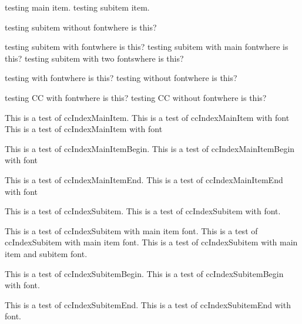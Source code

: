 \documentclass{article}
\begin{document}
{{{{testing main item.
testing subitem item.


testing subitem without fontwhere is this?

testing subitem with fontwhere is this?
testing subitem with main fontwhere is this?
testing subitem with two fontswhere is this?


testing with fontwhere is this?
testing without fontwhere is this?


testing CC with fontwhere is this?
testing CC without fontwhere is this?

This is a test of ccIndexMainItem.
This is a test of ccIndexMainItem with font
This is a test of ccIndexMainItem with font


This is a test of ccIndexMainItemBegin.
This is a test of ccIndexMainItemBegin with font

\pagebreak

This is a test of ccIndexMainItemEnd.
This is a test of ccIndexMainItemEnd with font


This is a test of ccIndexSubitem.
This is a test of ccIndexSubitem with font.


This is a test of ccIndexSubitem with main item font.
This is a test of ccIndexSubitem with main item font.
This is a test of ccIndexSubitem with main item and subitem font.

This is a test of ccIndexSubitemBegin.
This is a test of ccIndexSubitemBegin with font.

\pagebreak

This is a test of ccIndexSubitemEnd.
This is a test of ccIndexSubitemEnd with font.

}}}}
\end{document}
